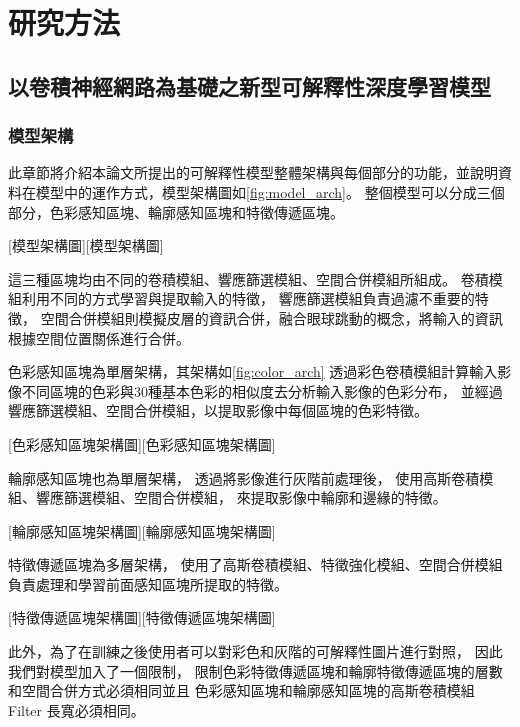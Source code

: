 \documentclass[class=NCU_thesis, crop=false]{standalone}
\begin{document}
\chapter{研究方法}

\section{以卷積神經網路為基礎之新型可解釋性深度學習模型}
\subsection{模型架構}

此章節將介紹本論文所提出的可解釋性模型整體架構與每個部分的功能，並說明資料在模型中的運作方式，模型架構圖如\cref{fig:model_arch}。
整個模型可以分成三個部分，色彩感知區塊、輪廓感知區塊和特徵傳遞區塊。

[模型架構圖][模型架構圖]

\pagebreak

這三種區塊均由不同的卷積模組、響應篩選模組、空間合併模組所組成。
卷積模組利用不同的方式學習與提取輸入的特徵，
響應篩選模組負責過濾不重要的特徵，
空間合併模組則模擬皮層的資訊合併，融合眼球跳動的概念，將輸入的資訊根據空間位置關係進行合併。

色彩感知區塊為單層架構，其架構如\cref{fig:color_arch}
透過彩色卷積模組計算輸入影像不同區塊的色彩與30種基本色彩的相似度去分析輸入影像的色彩分布，
並經過響應篩選模組、空間合併模組，以提取影像中每個區塊的色彩特徵。

[色彩感知區塊架構圖][色彩感知區塊架構圖]

輪廓感知區塊也為單層架構，
透過將影像進行灰階前處理後，
使用高斯卷積模組、響應篩選模組、空間合併模組，
來提取影像中輪廓和邊緣的特徵。

[輪廓感知區塊架構圖][輪廓感知區塊架構圖]

特徵傳遞區塊為多層架構，
使用了高斯卷積模組、特徵強化模組、空間合併模組
負責處理和學習前面感知區塊所提取的特徵。

[特徵傳遞區塊架構圖][特徵傳遞區塊架構圖]

此外，為了在訓練之後使用者可以對彩色和灰階的可解釋性圖片進行對照，
因此我們對模型加入了一個限制，
限制色彩特徵傳遞區塊和輪廓特徵傳遞區塊的層數和空間合併方式必須相同並且
色彩感知區塊和輪廓感知區塊的高斯卷積模組 Filter 長寬必須相同。
\end{document}
